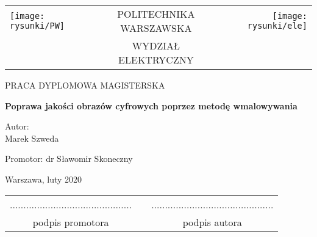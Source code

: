 \documentclass[12pt, twoside, openany]{report}
\theoremstyle{definition}
\begin{document}
\begin{titlepage}
\pagestyle{empty}

\noindent
\begin{Large}
\begin{table}[t]
\centering
\begin{tabular}[t]{lcr}
\texttt{[image: rysunki/PW]} & POLITECHNIKA WARSZAWSKA & \texttt{[image: rysunki/ele]}\\
& WYDZIAŁ ELEKTRYCZNY & \\
\end{tabular}
\end{table}

\begin{center}PRACA DYPLOMOWA MAGISTERSKA\end{center}
\end{Large}
\begin{center}
\Huge
\textbf{Poprawa jakości obrazów cyfrowych poprzez metodę wmalowywania}
\end{center}
\vfill
\begin{center}
\Large
Autor:\\
\LARGE
Marek Szweda
\end{center}
\vfill
\begin{center}
\Large
Promotor: dr Sławomir Skoneczny
\end{center}
\vfill
\begin{center}
\large
Warszawa, luty 2020
\end{center}
\newpage
\hfill
\begin{table}[b]
\centering
\begin{tabular}[t]{ccc}
............................................. & \hspace*{100pt} & .............................................\\
podpis promotora & \hspace*{100pt} & podpis autora
\end{tabular}
\end{table}


\end{titlepage}
\thispagestyle{empty}
\newpage
\pagestyle{headings}
\setcounter{page}{1}
\setcounter{secnumdepth}{3}
\end{document}
